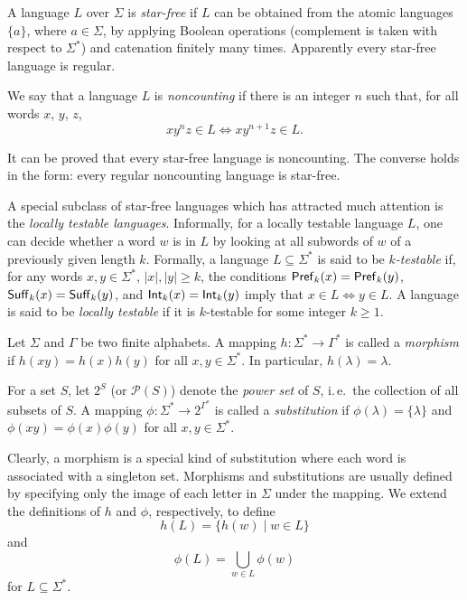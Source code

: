 A language $L$ over $\Sigma$ is \emph{star-free} if $L$ can be obtained from the atomic languages $\{a\}$, where $a \in \Sigma$, by applying Boolean operations (complement is taken with respect to $\Sigma^*$) and catenation finitely many times. Apparently every star-free language is regular.

We say that a language $L$ is \emph{noncounting} if there is an integer $n$ such that, for all words $x$, $y$, $z$,
$$x y^n z \in L \Leftrightarrow x y^{n+1} z \in L.$$

It can be proved that every star-free language is noncounting. The converse holds in the form: every regular noncounting language is star-free.

A special subclass of star-free languages which has attracted much attention is the \emph{locally testable languages}. Informally, for a locally testable language $L$, one can decide whether a word $w$ is in $L$ by looking at all subwords of $w$ of a previously given length $k$. Formally, a language $L \subseteq \Sigma^*$ is said to be \emph{$k$-testable} if, for any words $x, y \in \Sigma^*$, $|x|, |y| \ge k$, the conditions $\textup{\sf Pref\/}_k(x) = \textup{\sf Pref\/}_k(y)$, $\textup{\sf Suff\/}_k(x) = \textup{\sf Suff\/}_k(y)$, and $\textup{\sf Int\/}_k(x) = \textup{\sf Int\/}_k(y)$ imply that $x \in L \Leftrightarrow y \in L$. A language is said to be \emph{locally testable} if it is $k$-testable for some integer $k \ge 1$.

Let $\Sigma$ and $\Gamma$ be two finite alphabets. A mapping $h: \Sigma^* \to \Gamma^*$ is called a \emph{morphism} if $h(xy) = h(x) h(y)$ for all $x, y \in \Sigma^*$. In particular, $h(\lambda) = \lambda$.

For a set $S$, let $2^S$ (or $\mathcal{P}(S)$) denote the \emph{power set} of $S$, i.\,e.\ the collection of all subsets of $S$. A mapping $\phi: \Sigma^* \to 2^{\Gamma^*}$ is  called a \emph{substitution} if $\phi(\lambda) = \{\lambda\}$ and $\phi(xy) = \phi(x) \phi(y)$ for all $x, y \in \Sigma^*$.

Clearly, a morphism is a special kind of substitution where each word is associated with a singleton set. Morphisms and substitutions are usually defined by specifying only the image of each letter in $\Sigma$ under the mapping. We extend the definitions of $h$ and $\phi$, respectively, to define
$$h(L) = \{h(w) \mid w \in L\}$$
and
$$\phi(L) = \bigcup_{w \in L}\phi(w)$$
for $L \subseteq \Sigma^*$.

